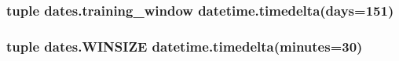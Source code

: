 \hypertarget{namespacedates_a81399f28153bf5b8b5dbed39dc4c8781}{
\subsubsection[{training\-\_\-window}]{\setlength{\rightskip}{0pt plus 5cm}tuple dates.\-training\-\_\-window datetime.\-timedelta(days=151)}}\label{namespacedates_a81399f28153bf5b8b5dbed39dc4c8781}
\hypertarget{namespacedates_ad8b2a27a0eefcdf0c7c50ad7aebeb42b}{
\subsubsection[{W\-I\-N\-S\-I\-Z\-E}]{\setlength{\rightskip}{0pt plus 5cm}tuple dates.\-W\-I\-N\-S\-I\-Z\-E datetime.\-timedelta(minutes=30)}}\label{namespacedates_ad8b2a27a0eefcdf0c7c50ad7aebeb42b}
